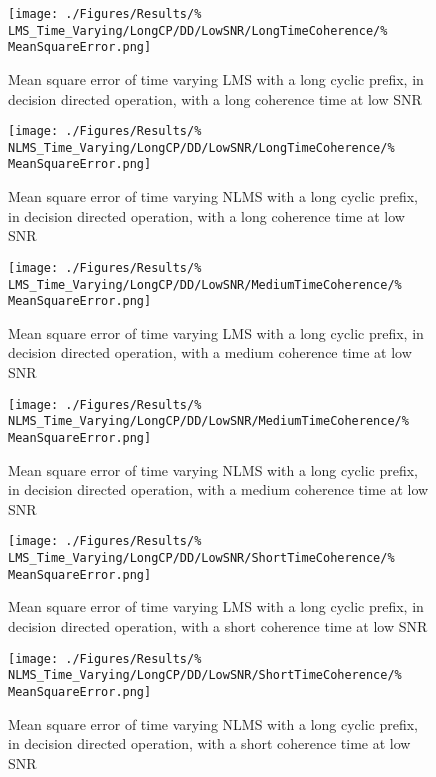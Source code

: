 \begin{figure}[ht]
	\begin{minipage}{0.49\textwidth}
		\texttt{[image: ./Figures/Results/\%
	LMS\_Time\_Varying/LongCP/DD/LowSNR/LongTimeCoherence/\%
	MeanSquareError.png]}
		\captionsetup{width=0.75\linewidth}
		\caption{Mean square error of time varying LMS with a 
		long cyclic prefix, in decision directed operation,
		with a long coherence time at low SNR}
	\end{minipage}
	\begin{minipage}{0.49\textwidth}
		\texttt{[image: ./Figures/Results/\%
	NLMS\_Time\_Varying/LongCP/DD/LowSNR/LongTimeCoherence/\%
	MeanSquareError.png]}
		\captionsetup{width=0.75\linewidth}
		\caption{Mean square error of time varying NLMS with 
		a long cyclic prefix, in decision directed operation,
		with a long coherence time at low SNR}
	\end{minipage}
\end{figure}

\begin{figure}[ht]
	\centering
	\begin{minipage}{0.49\textwidth}
		\centering
		\texttt{[image: ./Figures/Results/\%
	LMS\_Time\_Varying/LongCP/DD/LowSNR/MediumTimeCoherence/\%
	MeanSquareError.png]}
		\captionsetup{width=0.75\linewidth}
		\caption{Mean square error of time varying LMS with a 
		long cyclic prefix, in decision directed operation, 
		with a medium coherence time at low SNR}
	\end{minipage}
	\begin{minipage}{0.49\textwidth}
		\centering
		\texttt{[image: ./Figures/Results/\%
	NLMS\_Time\_Varying/LongCP/DD/LowSNR/MediumTimeCoherence/\%
	MeanSquareError.png]}
		\captionsetup{width=0.75\linewidth}
		\caption{Mean square error of time varying NLMS with 
		a long cyclic prefix, in decision directed operation,
		with a medium coherence time at low SNR}
	\end{minipage}
\end{figure}

\begin{figure}[ht]
	\begin{minipage}{0.49\textwidth}
		\centering
		\texttt{[image: ./Figures/Results/\%
	LMS\_Time\_Varying/LongCP/DD/LowSNR/ShortTimeCoherence/\%
	MeanSquareError.png]}
		\captionsetup{width=0.75\linewidth}
		\caption{Mean square error of time varying LMS with a 
		long cyclic prefix, in decision directed operation,
		with a short coherence time at low SNR}
	\end{minipage}
	\begin{minipage}{0.49\textwidth}
		\texttt{[image: ./Figures/Results/\%
	NLMS\_Time\_Varying/LongCP/DD/LowSNR/ShortTimeCoherence/\%
	MeanSquareError.png]}
		\captionsetup{width=0.75\linewidth}
		\caption{Mean square error of time varying NLMS with 
		a long cyclic prefix, in decision directed operation,
		with a short coherence time at low SNR}
	\end{minipage}
\end{figure}

